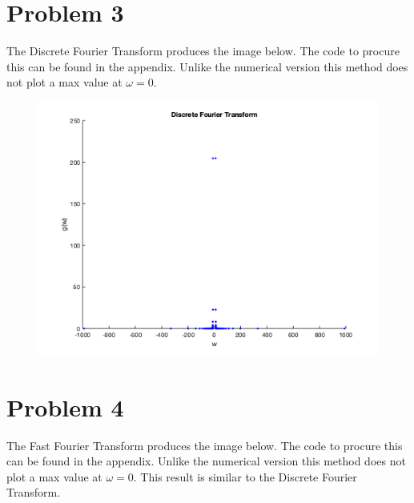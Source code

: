 \documentclass[12pt]{article}
\begin{document}
\newpage

\section*{Problem 3}

The Discrete Fourier Transform produces the image below. The code to procure this can be found in the appendix. Unlike the numerical version this method does not plot a max value at $\omega = 0$.


\begin{figure}[h!]
    \centering
    {{\includegraphics[width=15cm]{DFT.png}}}%
    \qquad
    \caption{ }%
    \label{fig:example}%
\end{figure}

\newpage

\section*{Problem 4}

The Fast Fourier Transform produces the image below. The code to procure this can be found in the appendix. Unlike the numerical version this method does not plot a max value at $\omega = 0$. This result is similar to the Discrete Fourier Transform.
\end{document}
